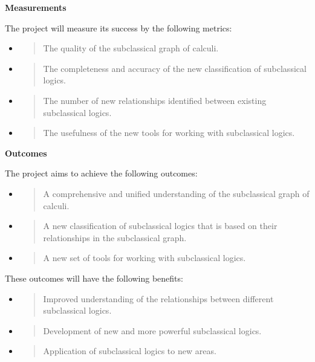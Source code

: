 \textbf{Measurements}

The project will measure its success by the following metrics:

\begin{itemize}
\item
  \begin{quote}
  The quality of the subclassical graph of calculi.
  \end{quote}
\item
  \begin{quote}
  The completeness and accuracy of the new classification of
  subclassical logics.
  \end{quote}
\item
  \begin{quote}
  The number of new relationships identified between existing
  subclassical logics.
  \end{quote}
\item
  \begin{quote}
  The usefulness of the new tools for working with subclassical logics.
  \end{quote}
\end{itemize}

\textbf{Outcomes}

The project aims to achieve the following outcomes:

\begin{itemize}
\item
  \begin{quote}
  A comprehensive and unified understanding of the subclassical graph of
  calculi.
  \end{quote}
\item
  \begin{quote}
  A new classification of subclassical logics that is based on their
  relationships in the subclassical graph.
  \end{quote}
\item
  \begin{quote}
  A new set of tools for working with subclassical logics.
  \end{quote}
\end{itemize}

These outcomes will have the following benefits:

\begin{itemize}
\item
  \begin{quote}
  Improved understanding of the relationships between different
  subclassical logics.
  \end{quote}
\item
  \begin{quote}
  Development of new and more powerful subclassical logics.
  \end{quote}
\item
  \begin{quote}
  Application of subclassical logics to new areas.
  \end{quote}
\end{itemize}

